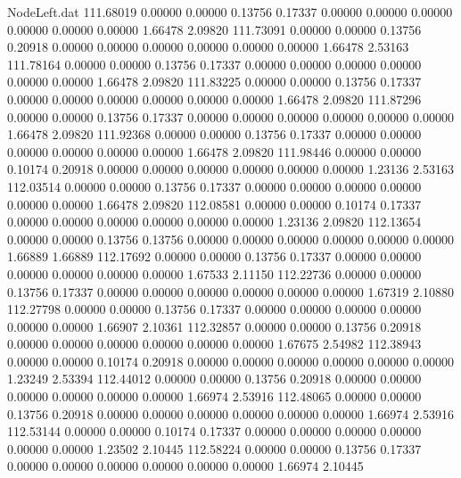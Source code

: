 \begin{filecontents}{NodeLeft.dat}
 111.68019    0.00000    0.00000     0.13756    0.17337    0.00000    0.00000    0.00000    0.00000    0.00000    0.00000    1.66478    2.09820
 111.73091    0.00000    0.00000     0.13756    0.20918    0.00000    0.00000    0.00000    0.00000    0.00000    0.00000    1.66478    2.53163
 111.78164    0.00000    0.00000     0.13756    0.17337    0.00000    0.00000    0.00000    0.00000    0.00000    0.00000    1.66478    2.09820
 111.83225    0.00000    0.00000     0.13756    0.17337    0.00000    0.00000    0.00000    0.00000    0.00000    0.00000    1.66478    2.09820
 111.87296    0.00000    0.00000     0.13756    0.17337    0.00000    0.00000    0.00000    0.00000    0.00000    0.00000    1.66478    2.09820
 111.92368    0.00000    0.00000     0.13756    0.17337    0.00000    0.00000    0.00000    0.00000    0.00000    0.00000    1.66478    2.09820
 111.98446    0.00000    0.00000     0.10174    0.20918    0.00000    0.00000    0.00000    0.00000    0.00000    0.00000    1.23136    2.53163
 112.03514    0.00000    0.00000     0.13756    0.17337    0.00000    0.00000    0.00000    0.00000    0.00000    0.00000    1.66478    2.09820
 112.08581    0.00000    0.00000     0.10174    0.17337    0.00000    0.00000    0.00000    0.00000    0.00000    0.00000    1.23136    2.09820
 112.13654    0.00000    0.00000     0.13756    0.13756    0.00000    0.00000    0.00000    0.00000    0.00000    0.00000    1.66889    1.66889
 112.17692    0.00000    0.00000     0.13756    0.17337    0.00000    0.00000    0.00000    0.00000    0.00000    0.00000    1.67533    2.11150
 112.22736    0.00000    0.00000     0.13756    0.17337    0.00000    0.00000    0.00000    0.00000    0.00000    0.00000    1.67319    2.10880
 112.27798    0.00000    0.00000     0.13756    0.17337    0.00000    0.00000    0.00000    0.00000    0.00000    0.00000    1.66907    2.10361
 112.32857    0.00000    0.00000     0.13756    0.20918    0.00000    0.00000    0.00000    0.00000    0.00000    0.00000    1.67675    2.54982
 112.38943    0.00000    0.00000     0.10174    0.20918    0.00000    0.00000    0.00000    0.00000    0.00000    0.00000    1.23249    2.53394
 112.44012    0.00000    0.00000     0.13756    0.20918    0.00000    0.00000    0.00000    0.00000    0.00000    0.00000    1.66974    2.53916
 112.48065    0.00000    0.00000     0.13756    0.20918    0.00000    0.00000    0.00000    0.00000    0.00000    0.00000    1.66974    2.53916
 112.53144    0.00000    0.00000     0.10174    0.17337    0.00000    0.00000    0.00000    0.00000    0.00000    0.00000    1.23502    2.10445
 112.58224    0.00000    0.00000     0.13756    0.17337    0.00000    0.00000    0.00000    0.00000    0.00000    0.00000    1.66974    2.10445

\end{filecontents}
